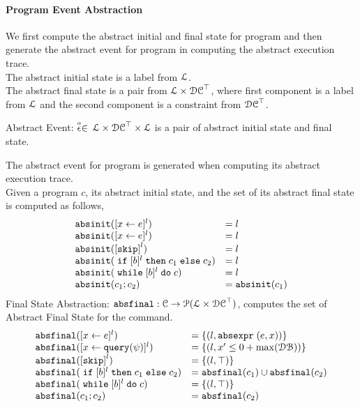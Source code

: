 \paragraph{Program Event Abstraction}
We first compute the abstract initial and final state for program and then generate the abstract event for program in 
computing the abstract execution trace.
\\
The abstract initial state is a label from $\mathcal{L}$.
\\
The abstract final state is a pair from $\mathcal{L} \times \mathcal{DC}^{\top}$,  
where first component is a label from $\mathcal{L}$ and the second component is a constraint from $\mathcal{DC}^{\top}$.
%
\begin{defn}
  \label{def:abs_event}
  Abstract Event: 
  $\stackrel{\scriptscriptstyle{\alpha}}{\mathtt{\epsilon}{}} \in $
  $\mathcal{L} \times \mathcal{DC}^{\top} \times \mathcal{L}$
  is a pair of abstract initial state and final state.
  \end{defn}
  The abstract event for program is generated when computing its abstract execution trace.
\\
%
Given a program $c$, its abstract initial state,
and the set of its abstract final state is computed as follows,
%
\[
  \begin{array}{ll}
    \absinit(\clabel{\assign{x}{\expr}}{}^l)  & = l  \\
    \absinit(\clabel{\assign{x}{\expr}}{}^l)  & = l \\
    \absinit(\clabel{\eskip}^{l})  & = l \\
    \absinit(\eif [b]^l \ethen c_1 \eelse c_2)  & = l \\
    \absinit(\ewhile [b]^l \edo c)  & = l \\
    \absinit(c_1 ; c_2)  & = \absinit(c_1) \\
 \end{array}
 \]
%
Final State Abstraction: 
$\mathtt{abs}{\mathtt{final}}: \mathcal{C} \to \mathcal{P}(\mathcal{L} \times \mathcal{DC}^{\top})$,
computes the set of Abstract Final State for the command. 
 \[
  \begin{array}{ll}
    \absfinal(\clabel{\assign{x}{\expr}}{}^l)  & = \{(l, \absexpr\eapp (\expr, x))\}  \\
     \absfinal(\clabel{\assign{x}{\query(\qexpr)}}{}^l)  & = \{
      (l, x' \leq 0 + \max(\dbdom) )\}  \\
     \absfinal(\clabel{\eskip}^{l})  
     & = \{(l, \top)\} \\
     \absfinal(\eif [b]^l \ethen c_1 \eelse c_2)  & = \absfinal(c_1) \cup \absfinal(c_2) \\
     \absfinal(\ewhile [b]^l \edo c)  & = \{(l, \top)\} \\
     \absfinal(c_1 ; c_2)  & =  \absfinal(c_2) \\
 \end{array}
 \]
